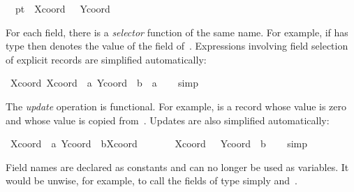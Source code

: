\begin{isabellebody}
\ \ {\isachardoublequote}pt{}\ {\isasymequiv}\ {\isasymlparr}Xcoord\ {\isacharequal}\ {\isacharminus}{}{}{\isacharcomma}\ Ycoord\ {\isacharequal}\ {}{}{\isasymrparr}{\isachardoublequote}\isamarkupfalse%
%
\begin{isamarkuptext}%
For each field, there is a \emph{selector}
  function of the same name.  For example, if  has type  then  denotes the value of the  field of~.  Expressions involving field selection
  of explicit records are simplified automatically:%
\end{isamarkuptext}%
\isamarkuptrue%
\ {\isachardoublequote}Xcoord\ {\isasymlparr}Xcoord\ {\isacharequal}\ a{\isacharcomma}\ Ycoord\ {\isacharequal}\ b{\isasymrparr}\ {\isacharequal}\ a{\isachardoublequote}\isanewline
\ \ \isamarkupfalse%
\ simp\isamarkupfalse%
%
\begin{isamarkuptext}%
The \emph{update} operation is functional.  For
  example,  is a record whose 
  value is zero and whose  value is copied from~.  Updates are also simplified automatically:%
\end{isamarkuptext}%
\isamarkuptrue%
\ {\isachardoublequote}{\isasymlparr}Xcoord\ {\isacharequal}\ a{\isacharcomma}\ Ycoord\ {\isacharequal}\ b{\isasymrparr}{\isasymlparr}Xcoord\ {\isacharcolon}{\isacharequal}\ {}{\isasymrparr}\ {\isacharequal}\isanewline
\ \ \ \ {\isasymlparr}Xcoord\ {\isacharequal}\ {}{\isacharcomma}\ Ycoord\ {\isacharequal}\ b{\isasymrparr}{\isachardoublequote}\isanewline
\ \ \isamarkupfalse%
\ simp\isamarkupfalse%
%
\begin{isamarkuptext}%
\begin{warn}
  Field names are declared as constants and can no longer be used as
  variables.  It would be unwise, for example, to call the fields of
  type  simply  and~.
  \end{warn}%
\end{isamarkuptext}%
\isamarkuptrue%
%
\isamarkuptrue%
%
\begin{isamarkuptext}%
%


\end{isamarkuptext}
\end{isabellebody}
